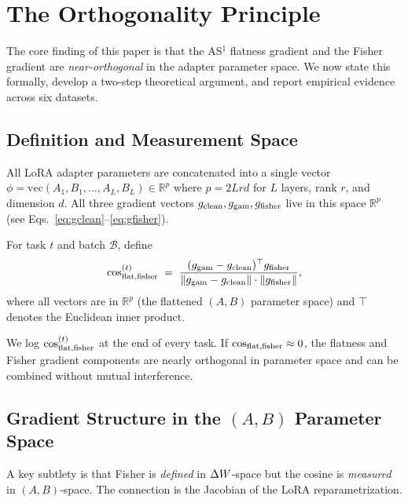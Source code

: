 \section{The Orthogonality Principle}
\label{sec:orthogonality}

The core finding of this paper is that the AS$^1$ flatness gradient and the Fisher gradient
are \emph{near-orthogonal} in the adapter parameter space.
We now state this formally, develop a two-step theoretical argument,
and report empirical evidence across six datasets.

\subsection{Definition and Measurement Space}
\label{sec:cosine_def}

All LoRA adapter parameters are concatenated into a single vector
$\phi = \mathrm{vec}(A_1, B_1, \ldots, A_L, B_L) \in \mathbb{R}^p$
where $p = 2Lrd$ for $L$ layers, rank $r$, and dimension $d$.
All three gradient vectors $g_{\mathrm{clean}}, g_{\mathrm{gam}}, g_{\mathrm{fisher}}$ live in this space $\mathbb{R}^p$
(see Eqs.~\eqref{eq:gclean}--\eqref{eq:gfisher}).

\begin{definition}
\label{def:cosff}
For task $t$ and batch $\mathcal{B}$, define
\begin{equation}
  \cos_{\mathrm{flat,fisher}}^{(t)} \;=\; \frac{(g_{\mathrm{gam}} - g_{\mathrm{clean}})^\top g_{\mathrm{fisher}}}
    {\|g_{\mathrm{gam}} - g_{\mathrm{clean}}\| \cdot \|g_{\mathrm{fisher}}\|},
  \label{eq:cosff}
\end{equation}
where all vectors are in $\mathbb{R}^p$ (the flattened $(A,B)$ parameter space)
and $\top$ denotes the Euclidean inner product.
\end{definition}

We log $\cos_{\mathrm{flat,fisher}}^{(t)}$ at the end of every task.
If $\cos_{\mathrm{flat,fisher}} \approx 0$, the flatness and Fisher gradient components are nearly orthogonal
in parameter space and can be combined without mutual interference.

\subsection{Gradient Structure in the $(A,B)$ Parameter Space}
\label{sec:grad_structure}

A key subtlety is that Fisher is \emph{defined} in $\Delta W$-space but the cosine is
\emph{measured} in $(A,B)$-space.
The connection is the Jacobian of the LoRA reparametrization.

